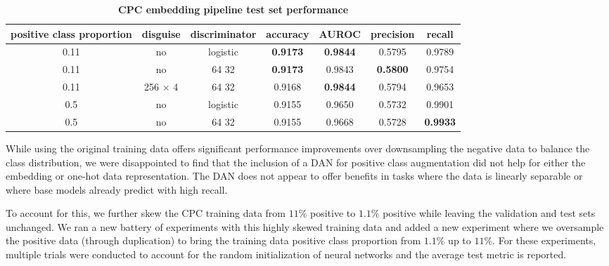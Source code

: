 \documentclass{proc}
\begin{document}
\begin{table}[]
\begin{center}
	\begin{tabular}{|c|c|c|c|c|c|c|}
		\hline
 		\textbf{positive class proportion} &  \textbf{disguise} & \textbf{discriminator} & \textbf{accuracy} & \textbf{AUROC} & \textbf{precision} & \textbf{recall} \\ \hline
 		0.11 & no & logistic & \textbf{0.9173} & \textbf{0.9844} & 0.5795 & 0.9789 \\ \hline
 		0.11 & no & 64 32 & \textbf{0.9173} & 0.9843 & \textbf{0.5800} & 0.9754 \\ \hline
 		0.11 & 256 $\times$ 4 & 64 32 & 0.9168 & \textbf{0.9844} & 0.5794 & 0.9653 \\ \hline
 		0.5 & no & logistic & 0.9155 & 0.9650 & 0.5732 & 0.9901 \\ \hline
  		0.5 & no & 64 32 & 0.9155 & 0.9668 & 0.5728 & \textbf{0.9933} \\ \hline
	\end{tabular}
	\caption{\textbf{CPC embedding pipeline test set performance}}
	\label{table:cpc-embedding-results}
\end{center}
\end{table}

While using the original training data offers significant performance improvements over downsampling the negative data to balance the class distribution, we were disappointed to find that the inclusion of a DAN for positive class augmentation did not help for either the embedding or one-hot data representation. The DAN does not appear to offer benefits in tasks where the data is linearly separable or where base models already predict with high recall.

To account for this, we further skew the CPC training data from $11\%$ positive to $1.1\%$ positive while leaving the validation and test sets unchanged. We ran a new battery of experiments with this highly skewed training data and added a new experiment where we oversample the positive data (through duplication) to bring the training data positive class proportion from $1.1\%$ up to $11\%$. For these experiments, multiple trials were conducted to account for the random initialization of neural networks and the average test metric is reported.
\end{document}

